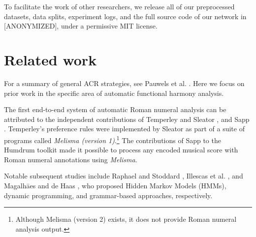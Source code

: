\documentclass{article}
\newcommand{\guide}[1]{}
\begin{document}
To facilitate the work of other researchers, we release all of our preprocessed datasets, data splits, experiment logs, and the full source code of our network in [ANONYMIZED], under a permissive MIT license.


\section{Related work}

\guide{Chord recognition task.}
For a summary of general ACR strategies, see Pauwels et al. \cite{pauwels_20_2019}. 
Here we focus on prior work  in the specific area of automatic functional harmony analysis.



\guide{First end-to-end system.}
The first end-to-end system of automatic Roman numeral analysis can be attributed to the independent contributions of Temperley and Sleator \cite{temperley_cognition_2004}, and Sapp \cite{sapp_tsroot_2009}.
Temperley's preference rules were implemented by Sleator as part of a suite of programs called \emph{Melisma (version 1)}.\footnote{Although Melisma (version 2) exists, it does not provide Roman numeral analysis output.} 
The contributions of Sapp to the Humdrum toolkit \cite{huron_music_2002} made it possible to process any encoded musical score with Roman numeral annotations using \emph{Melisma}.

\guide{Before deep learning.}
Notable subsequent studies include Raphael and Stoddard \cite{raphael_functional_2004}, Illescas et al. \cite{illescas_harmonic_2007}, and Magalh\=aes and de Haas \cite{magalhaes_functional_2011}, who proposed Hidden Markov Models (HMMs), dynamic programming, and grammar-based approaches, respectively. 
\end{document}
